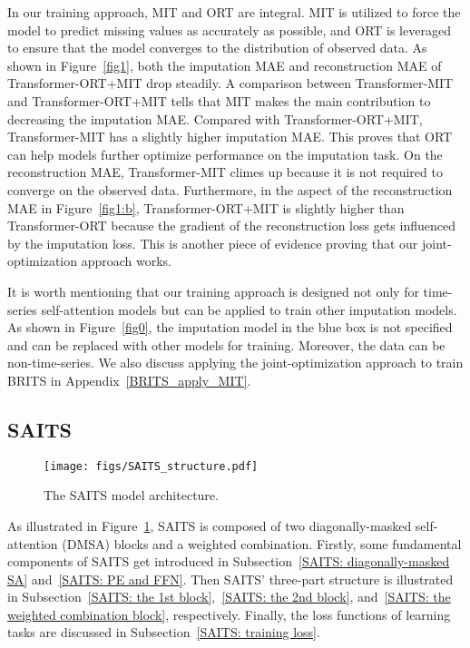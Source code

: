 \documentclass{article}
\begin{document}
In our training approach, MIT and ORT are integral. MIT is utilized to force the model to predict missing values as accurately as possible, and ORT is leveraged to ensure that the model converges to the distribution of observed data. As shown in Figure~\ref{fig1}, both the imputation MAE and reconstruction MAE of Transformer-ORT+MIT drop steadily. A comparison between Transformer-MIT and Transformer-ORT+MIT tells that MIT makes the main contribution to decreasing the imputation MAE. Compared with Transformer-ORT+MIT, Transformer-MIT has a slightly higher imputation MAE. This proves that ORT can help models further optimize performance on the imputation task. On the reconstruction MAE, Transformer-MIT climes up because it is not required to converge on the observed data. Furthermore, in the aspect of the reconstruction MAE in Figure~\ref{fig1:b}, Transformer-ORT+MIT is slightly higher than Transformer-ORT because the gradient of the reconstruction loss gets influenced by the imputation loss. This is another piece of evidence proving that our joint-optimization approach works.

It is worth mentioning that our training approach is designed not only for time-series self-attention models but can be applied to train other imputation models. As shown in Figure~\ref{fig0}, the imputation model in the blue box is not specified and can be replaced with other models for training. Moreover, the data can be non-time-series. We also discuss applying the joint-optimization approach to train BRITS in Appendix~\ref{BRITS_apply_MIT}.

\subsection{SAITS} \label{methodology: SAITS}
\begin{figure}[!ht]
	\centering
	\texttt{[image: figs/SAITS\_structure.pdf]}
	\caption{The SAITS model architecture.}
	\label{fig:SAITS_structure}
\end{figure}

As illustrated in Figure~\ref{fig:SAITS_structure}, SAITS is composed of two diagonally-masked self-attention (DMSA) blocks and a weighted combination. Firstly, some fundamental components of SAITS get introduced in Subsection~\ref{SAITS: diagonally-masked SA} and~\ref{SAITS: PE and FFN}. Then SAITS' three-part structure is illustrated in Subsection~\ref{SAITS: the 1st block},~\ref{SAITS: the 2nd block}, and~\ref{SAITS: the weighted combination block}, respectively. Finally, the loss functions of learning tasks are discussed in Subsection~\ref{SAITS: training loss}.
\end{document}
